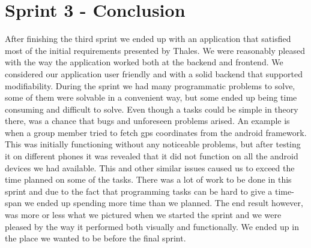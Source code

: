 \section{Sprint 3 - Conclusion}
After finishing the third sprint we ended up with an application that satisfied most of the initial requirements presented by Thales. We were reasonably pleased with the way the application worked both at the backend and frontend. We considered our application user friendly and with a solid backend that supported modifiability. 
\newline
\newline
During the sprint we had many programmatic problems to solve, some of them were solvable in a convenient way, but some ended up being time consuming and difficult to solve. Even though a tasks could be simple in theory there, was a chance that bugs and unforeseen problems arised. An example is when a group member tried to fetch gps coordinates from the android framework. This was initially functioning without any noticeable problems, but after testing it on different phones it was revealed that it did not function on all the android devices we had available. This and other similar issues caused us to exceed the time planned on some of the tasks. 
\newline
\newline
There was a lot of work to be done in this sprint and due to the fact that programming tasks can be hard to give a time-span we ended up spending more time than we planned. The end result however, was more or less what we pictured when we started the sprint and we were pleased by the way it performed both visually and functionally. We ended up in the place we wanted to be before the final sprint.